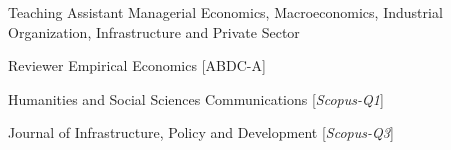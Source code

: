 
\begin{cvskills}
\cvskill
{Teaching Assistant} %
{Managerial Economics, Macroeconomics, Industrial Organization, Infrastructure and Private Sector} %

\cvskill
{Reviewer} %
{Empirical Economics [ABDC-A]} %

\cvskill
{} %
{Humanities and Social Sciences Communications [\textit{Scopus-Q1}]} %

\cvskill
{} %
{Journal of Infrastructure, Policy and Development [\textit{Scopus-Q3}]} %

\end{cvskills}
\relax